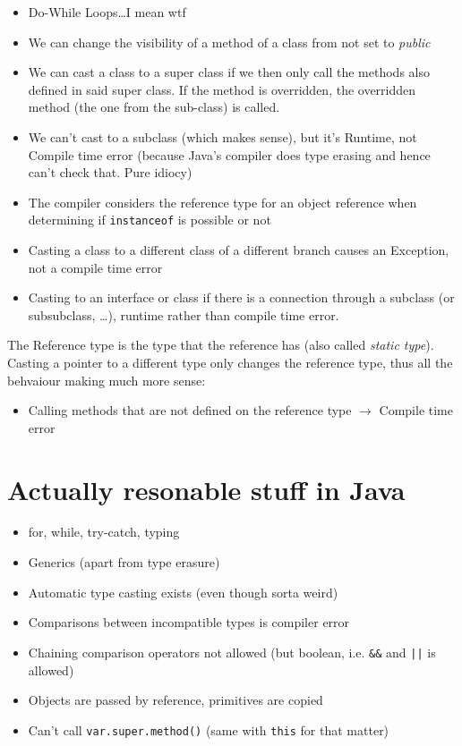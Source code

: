 \begin{itemize}
    \item Do-While Loops\dots I mean wtf
    \item We can change the visibility of a method of a class from not set to \textit{public}
    \item We can cast a class to a super class if we then only call the methods also defined in said super class. If the method is overridden, the overridden method (the one from the sub-class) is called.
    \item We can't cast to a subclass (which makes sense), but it's Runtime, not Compile time error (because Java's compiler does type erasing and hence can't check that. Pure idiocy)
    \item The compiler considers the reference type for an object reference when determining if \texttt{instanceof} is possible or not
    \item Casting a class to a different class of a different branch causes an Exception, not a compile time error
    \item Casting to an interface or class if there is a connection through a subclass (or subsubclass, \dots), runtime rather than compile time error.
\end{itemize}

The Reference type is the type that the reference has (also called \textit{static type}). Casting a pointer to a different type only changes the reference type, thus all the behvaiour making much more sense:
\begin{itemize}
    \item Calling methods that are not defined on the reference type $\rightarrow$ Compile time error
\end{itemize}

\section{Actually resonable stuff in Java}

\begin{itemize}
    \item for, while, try-catch, typing
    \item Generics (apart from type erasure)
    \item Automatic type casting exists (even though sorta weird)
    \item Comparisons between incompatible types is compiler error
    \item Chaining comparison operators not allowed (but boolean, i.e. \texttt{\&\&} and \texttt{||} is allowed)
    \item Objects are passed by reference, primitives are copied
    \item Can't call \texttt{var.super.method()} (same with \texttt{this} for that matter)
\end{itemize}


